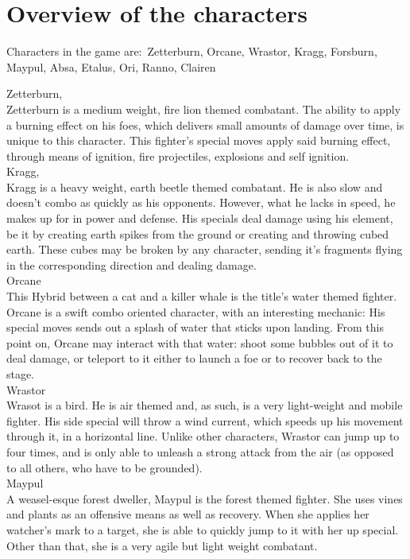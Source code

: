 \documentclass[11pt]{article}
\begin{document}
\chapter{Overview of the characters}

Characters in the game are:\
Zetterburn, Orcane, Wrastor, Kragg, Forsburn, Maypul, Absa, Etalus, Ori, Ranno, Clairen %

Zetterburn,\\
Zetterburn is a medium weight, fire lion themed combatant. The ability to apply a burning effect on his foes, which delivers small amounts of damage over time, is unique to this character. This fighter's special moves apply said burning effect, through means of ignition, fire projectiles, explosions and self ignition.\\
Kragg,\\
Kragg is a heavy weight, earth beetle themed combatant. He is also slow and doesn't combo as quickly as his opponents. However, what he lacks in speed, he makes up for in power and defense. His specials deal damage using his element, be it by creating earth spikes from the ground or creating and throwing cubed earth. These cubes may be broken by any character, sending it's fragments flying in the corresponding direction and dealing damage.\\
Orcane\\
This Hybrid between a cat and a killer whale is the title's water themed fighter. Orcane is a swift combo oriented character, with an interesting mechanic: His special moves sends out a splash of water that sticks upon landing. From this point on, Orcane may interact with that water: shoot some bubbles out of it to deal damage, or teleport to it either to launch a foe or to recover back to the stage.\\
Wrastor\\
Wrasot is a bird. He is air themed and, as such, is a very light-weight and mobile fighter. His side special will throw a wind current, which speeds up his movement through it, in a horizontal line. Unlike other characters, Wrastor can jump up to four times, and is only able to unleash a strong attack from the air (as opposed to all others, who have to be grounded).
\\
Maypul\\
A weasel-esque forest dweller, Maypul is the forest themed fighter. She uses vines and plants as an offensive means as well as recovery. When she applies her watcher's mark to a target, she is able to quickly jump to it with her up special. Other than that, she is a very agile but light weight combatant.
\end{document}
